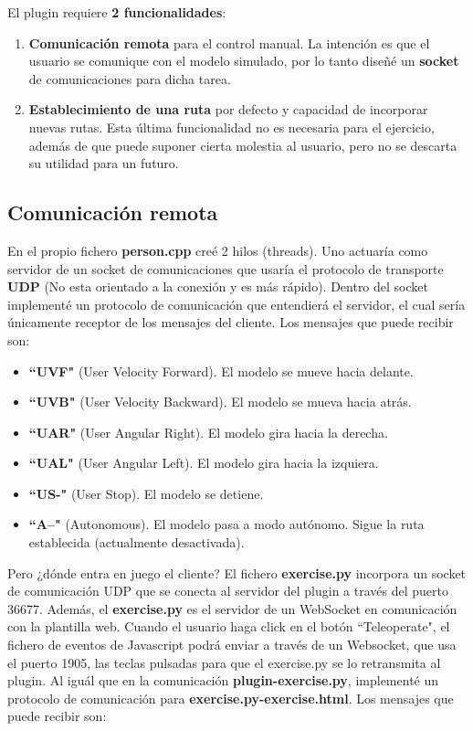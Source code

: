 El plugin requiere \textbf{2 funcionalidades}:
\begin{enumerate}
	\item \textbf{Comunicación remota} para el control manual. La intención es que el usuario se comunique con el modelo simulado, por lo tanto diseñé un \textbf{socket} de comunicaciones para dicha tarea.
	\item \textbf{Establecimiento de una ruta} por defecto y capacidad de incorporar nuevas rutas. Esta última funcionalidad no es necesaria para el ejercicio, además de que puede suponer cierta molestia al usuario, pero no se descarta su utilidad para un futuro.
\end{enumerate}


\subsection{Comunicación remota}
\label{subsec:comunicacion_remota}

En el propio fichero \textbf{person.cpp} creé 2 hilos (threads). Uno actuaría como servidor de un socket de comunicaciones que usaría el protocolo de transporte \textbf{UDP} (No esta orientado a la conexión y es más rápido). Dentro del socket implementé un protocolo de comunicación que entendierá el servidor, el cual sería únicamente receptor de los mensajes del cliente. Los mensajes que puede recibir son:

\begin{itemize}
	\item \textbf{``UVF"} (User Velocity Forward). El modelo se mueve hacia delante.
	\item \textbf{``UVB"} (User Velocity Backward). El modelo se mueva hacia atrás.
	\item \textbf{``UAR"} (User Angular Right). El modelo gira hacia la derecha.
	\item \textbf{``UAL"} (User Angular Left). El modelo gira hacia la izquiera.
	\item \textbf{``US-"} (User Stop). El modelo se detiene.
	\item \textbf{``A--"} (Autonomous). El modelo pasa a modo autónomo. Sigue la ruta establecida (actualmente desactivada).
\end{itemize}

Pero ¿dónde entra en juego el cliente? El fichero \textbf{exercise.py} incorpora un socket de comunicación UDP que se conecta al servidor del plugin a través del puerto 36677. Además, el \textbf{exercise.py} es el servidor de un WebSocket en comunicación con la plantilla web. Cuando el usuario haga click en el botón ``Teleoperate", el fichero de eventos de Javascript podrá enviar a través de un Websocket, que usa el puerto 1905, las teclas pulsadas para que el exercise.py se lo retransmita al plugin. Al iguál que en la comunicación \textbf{plugin-exercise.py}, implementé un protocolo de comunicación para \textbf{exercise.py-exercise.html}. Los mensajes que puede recibir son:

